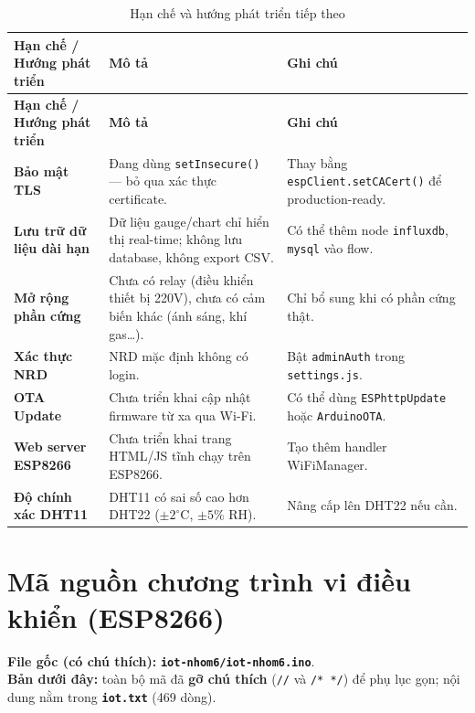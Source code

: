 \documentclass[13pt,a4paper]{article}
\newcommand{\code}[1]{\texttt{#1}}
\newcommand{\file}[1]{\textbf{\texttt{#1}}}
\begin{document}
\begin{longtable}{|L{4cm}|L{6cm}|L{3.5cm}|}
    \caption{Hạn chế và hướng phát triển tiếp theo}
    \label{tbl:limitations} \\
    \hline
    \textbf{Hạn chế / Hướng phát triển} & \textbf{Mô tả} & \textbf{Ghi chú} \\
    \hline
    \endfirsthead
    \hline
    \textbf{Hạn chế / Hướng phát triển} & \textbf{Mô tả} & \textbf{Ghi chú} \\
    \hline
    \endhead
    \hline
    \endfoot
    \textbf{Bảo mật TLS} & Đang dùng \code{setInsecure()} --- bỏ qua xác thực certificate. & Thay bằng \code{espClient.setCACert()} để production-ready. \\
    \hline
    \textbf{Lưu trữ dữ liệu dài hạn} & Dữ liệu gauge/chart chỉ hiển thị real-time; không lưu database, không export CSV. & Có thể thêm node \code{influxdb}, \code{mysql} vào flow. \\
    \hline
    \textbf{Mở rộng phần cứng} & Chưa có relay (điều khiển thiết bị 220V), chưa có cảm biến khác (ánh sáng, khí gas…). & Chỉ bổ sung khi có phần cứng thật. \\
    \hline
    \textbf{Xác thực NRD} & NRD mặc định không có login. & Bật \code{adminAuth} trong \code{settings.js}. \\
    \hline
    \textbf{OTA Update} & Chưa triển khai cập nhật firmware từ xa qua Wi-Fi. & Có thể dùng \code{ESPhttpUpdate} hoặc \code{ArduinoOTA}. \\
    \hline
    \textbf{Web server ESP8266} & Chưa triển khai trang HTML/JS tĩnh chạy trên ESP8266. & Tạo thêm handler WiFiManager. \\
    \hline
    \textbf{Độ chính xác DHT11} & DHT11 có sai số cao hơn DHT22 ($\pm2^\circ$C, $\pm5\%$ RH). & Nâng cấp lên DHT22 nếu cần. \\
    \hline
\end{longtable}

\appendix
\section{Mã nguồn chương trình vi điều khiển (ESP8266)}
\label{sec:code}

\textbf{File gốc (có chú thích):} \file{iot-nhom6/iot-nhom6.ino}.\\
\textbf{Bản dưới đây:} toàn bộ mã đã \textbf{gỡ chú thích} (\texttt{//} và \texttt{/* */}) để phụ lục gọn; nội dung nằm trong \file{iot.txt} (469 dòng).
\end{document}
